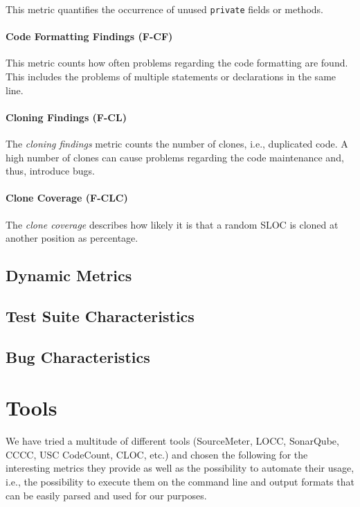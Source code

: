 \documentclass{scrartcl}
\begin{document}
This metric quantifies the occurrence of unused \texttt{private} fields or
methods.

\paragraph{Code Formatting Findings (F-CF)}

This metric counts how often problems regarding the code formatting are found.
This includes the problems of multiple statements or declarations in the same
line.

\paragraph{Cloning Findings (F-CL)}

The \emph{cloning findings} metric counts the number of clones, i.e., duplicated
code. A high number of clones can cause problems regarding the code maintenance
and, thus, introduce bugs.

\paragraph{Clone Coverage (F-CLC)}

The \emph{clone coverage} describes how likely it is that a random SLOC is
cloned at another position as percentage.

\subsection{Dynamic Metrics}

\subsection{Test Suite Characteristics}

\subsection{Bug Characteristics}

\section{Tools}

We have tried a multitude of different tools (SourceMeter, LOCC, SonarQube,
CCCC, USC CodeCount, CLOC, etc.) and chosen the following for the interesting
metrics they provide as well as the possibility to automate their usage, i.e.,
the possibility to execute them on the command line and output formats that can
be easily parsed and used for our purposes.
\end{document}
